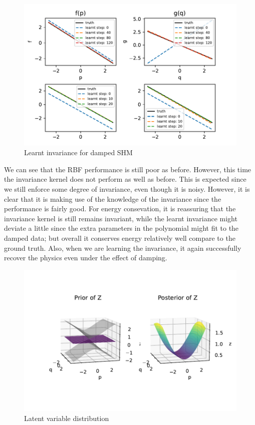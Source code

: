 \documentclass{statsmsc}
\begin{document}
\begin{figure}[H] 
  \includegraphics[width=0.8\linewidth]{../codes/figures/damped_shm_learnt_over_time.pdf}
  \centering
  \caption{Learnt invariance for damped SHM}
  \label{fig:damped_shm_learnt}
\end{figure}

We can see that the RBF performance is still poor as before.
However, this time the invariance kernel does not perform as well as before. 
This is expected since we still enforce some degree of invariance, even though it is noisy. 
However, it is clear that it is making use of the knowledge of the invariance since the performance is fairly good.
For energy consevation, it is reassuring that the invariance kernel is still remains invariant, while the learnt invariance might deviate a little since the extra parameters in the polynomial might fit to the damped data; but overall it conserves energy relatively well compare to the ground truth.
Also, when we are learning the invariance, it again successfully recover the physics even under the effect of damping.

\begin{figure}[H] 
  \includegraphics[width=0.8\linewidth]{../codes/figures/latent_damped_shm.pdf}
  \centering
  \caption{Latent variable distribution}
  \label{fig:latent_damped_shm}
\end{figure}
\end{document}
